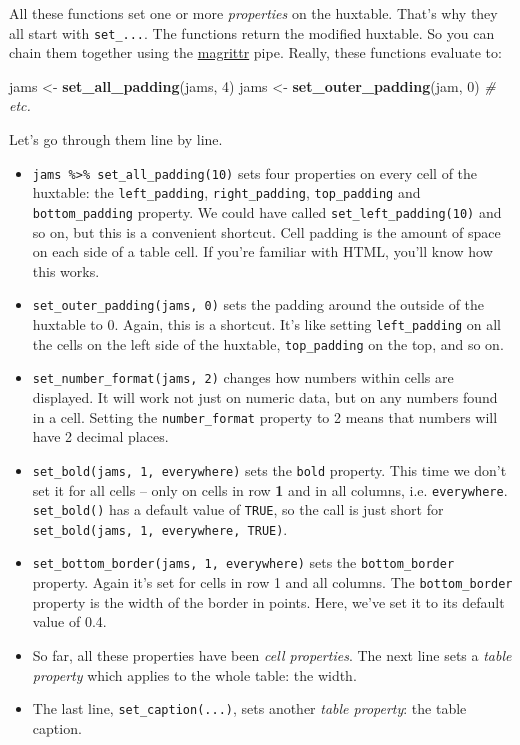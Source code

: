 \documentclass[]{article}
\newenvironment{Shaded}{\begin{snugshade}}{\end{snugshade}}
\newcommand{\CommentTok}[1]{\textcolor[rgb]{0.56,0.35,0.01}{\textit{#1}}}
\newcommand{\DecValTok}[1]{\textcolor[rgb]{0.00,0.00,0.81}{#1}}
\newcommand{\KeywordTok}[1]{\textcolor[rgb]{0.13,0.29,0.53}{\textbf{#1}}}
\newcommand{\NormalTok}[1]{#1}
\newcommand{\StringTok}[1]{\textcolor[rgb]{0.31,0.60,0.02}{#1}}
\providecommand{\tightlist}{%
  \setlength{\itemsep}{0pt}\setlength{\parskip}{0pt}}
\begin{document}
\FloatBarrier

All these functions set one or more \emph{properties} on the huxtable.
That's why they all start with \texttt{set\_...}. The functions return
the modified huxtable. So you can chain them together using the
\href{https://magrittr.tidyverse.org/}{magrittr} pipe. Really, these
functions evaluate to:

\begin{Shaded}
\begin{Highlighting}[]
\NormalTok{jams <-}\StringTok{ }\KeywordTok{set_all_padding}\NormalTok{(jams, }\DecValTok{4}\NormalTok{)}
\NormalTok{jams <-}\StringTok{ }\KeywordTok{set_outer_padding}\NormalTok{(jam, }\DecValTok{0}\NormalTok{)}
\CommentTok{# etc.}
\end{Highlighting}
\end{Shaded}

\FloatBarrier

Let's go through them line by line.

\begin{itemize}
\tightlist
\item
  \texttt{jams\ \%\textgreater{}\%\ set\_all\_padding(10)} sets four
  properties on every cell of the huxtable: the \texttt{left\_padding},
  \texttt{right\_padding}, \texttt{top\_padding} and
  \texttt{bottom\_padding} property. We could have called
  \texttt{set\_left\_padding(10)} and so on, but this is a convenient
  shortcut. Cell padding is the amount of space on each side of a table
  cell. If you're familiar with HTML, you'll know how this works.
\item
  \texttt{set\_outer\_padding(jams,\ 0)} sets the padding around the
  outside of the huxtable to 0. Again, this is a shortcut. It's like
  setting \texttt{left\_padding} on all the cells on the left side of
  the huxtable, \texttt{top\_padding} on the top, and so on.
\item
  \texttt{set\_number\_format(jams,\ 2)} changes how numbers within
  cells are displayed. It will work not just on numeric data, but on any
  numbers found in a cell. Setting the \texttt{number\_format} property
  to 2 means that numbers will have 2 decimal places.
\item
  \texttt{set\_bold(jams,\ 1,\ everywhere)} sets the \texttt{bold}
  property. This time we don't set it for all cells -- only on cells in
  row \textbf{1} and in all columns, i.e. \texttt{everywhere}.
  \texttt{set\_bold()} has a default value of \texttt{TRUE}, so the call
  is just short for \texttt{set\_bold(jams,\ 1,\ everywhere,\ TRUE)}.
\item
  \texttt{set\_bottom\_border(jams,\ 1,\ everywhere)} sets the
  \texttt{bottom\_border} property. Again it's set for cells in row 1
  and all columns. The \texttt{bottom\_border} property is the width of
  the border in points. Here, we've set it to its default value of 0.4.
\item
  So far, all these properties have been \emph{cell properties}. The
  next line sets a \emph{table property} which applies to the whole
  table: the width.
\item
  The last line, \texttt{set\_caption(...)}, sets another \emph{table
  property}: the table caption.
\end{itemize}
\end{document}
